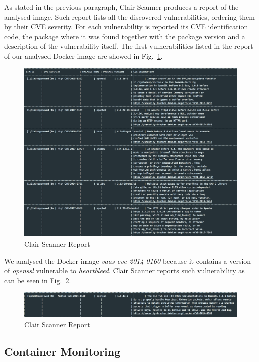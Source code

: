 \documentclass[a4paper,12pt]{article}
\def\myfig#1{Fig.~#1\xspace}
\begin{document}
As stated in the previous paragraph, Clair Scanner produces a report of the
analysed image. Such report lists all the discovered vulnerabilities, ordering
them by their CVE severity. For each vulnerability is reported its CVE
identification code, the package where it was found together with the package
version and a description of the vulnerability itself. The first vulnerabilities
listed in the report of our analysed Docker image are showed in
\myfig{\ref{fig:clair_report}}.

\begin{figure}[ht!]
  \centerline{\includegraphics[width=1\textwidth]{clair_report.png}}
  \caption{Clair Scanner Report}
  \label{fig:clair_report}
  \end{figure}

We analysed the Docker image \textit{vaas-cve-2014-0160} because it contains a
version of \textit{openssl} vulnerable to \textit{heartbleed}. Clair Scanner
reports such vulnerability as can be seen in \myfig{\ref{fig:clair_heartbleed}}.

  \begin{figure}[ht!]
    \centerline{\includegraphics[width=1\textwidth]{clair_heartbleed.png}}
    \caption{Clair Scanner Report}
    \label{fig:clair_heartbleed}
    \end{figure}

\subsection{Container Monitoring}
\end{document}
